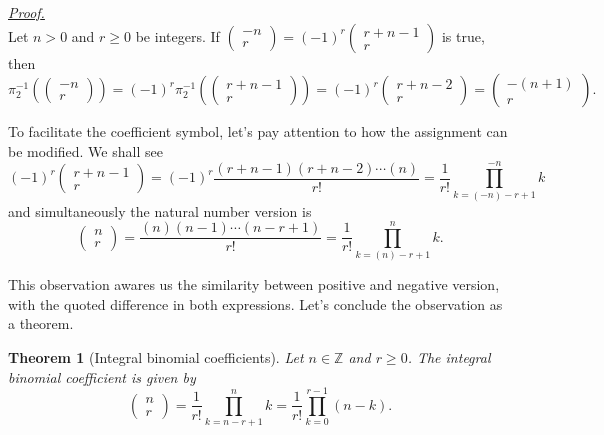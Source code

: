 \documentclass[12pt]{article}
\newtheorem*{theorem}{Theorem}
\renewenvironment{proof}[1][Proof]{\begin{snugshade*} \underline{\textit{{#1}.}}\\}{\hfill \qedsymbol \end{snugshade*}}
\begin{document}
    \begin{proof}
        Let $n>0$ and $r\geq 0$ be integers. If $\begin{pmatrix}
            -n\\r
        \end{pmatrix}=(-1)^r\begin{pmatrix}
            r+n-1\\r
        \end{pmatrix}$ is true, then \[\pi_2^{-1}(\begin{pmatrix}
            -n\\r
        \end{pmatrix})=(-1)^r \pi_2^{-1}(\begin{pmatrix}
            r+n-1\\r
        \end{pmatrix})=(-1)^r \begin{pmatrix}
            r+n-2\\r
        \end{pmatrix}=\begin{pmatrix}
            -(n+1)\\r
        \end{pmatrix}.\]
    \end{proof}

    To facilitate the coefficient symbol, let's pay attention to how the assignment can be modified. We shall see \[(-1)^r\begin{pmatrix}
        r+n-1\\r
    \end{pmatrix}=(-1)^r\frac{(r+n-1)(r+n-2)\cdots(n)}{r!}=\frac{1}{r!}\prod_{k=(-n)-r+1}^{-n}k\] and simultaneously the natural number version is \[\begin{pmatrix}
        n\\r
    \end{pmatrix}=\frac{(n)(n-1)\cdots(n-r+1)}{r!}=\frac{1}{r!}\prod_{k=(n)-r+1}^{n}k.\]

    This observation awares us the similarity between positive and negative version, with the quoted difference in both expressions. Let's conclude the observation as a theorem.

    \begin{theorem}[Integral binomial coefficients]
        Let $n\in\mathbb{Z}$ and $r\geq 0$. The integral binomial coefficient is given by \[\begin{pmatrix}
            n\\r
        \end{pmatrix}=\frac{1}{r!}\prod_{k=n-r+1}^{n}k=\frac{1}{r!}\prod_{k=0}^{r-1} (n-k).\]
    \end{theorem}
\end{document}
